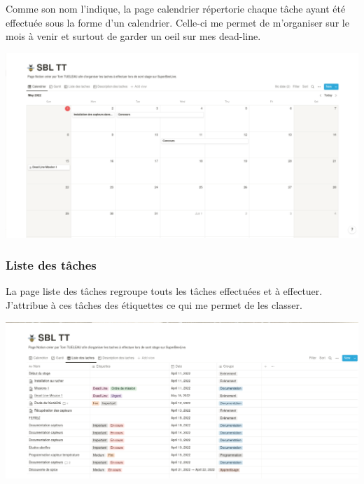 \documentclass[11pt,french,a4paper]{article}
\begin{document}
Comme son nom l'indique, la page calendrier répertorie chaque tâche ayant été effectuée sous la forme d'un calendrier. Celle-ci me permet de m'organiser sur le mois à venir et surtout de garder un oeil sur mes dead-line. 
\begin{center}	
\includegraphics[scale=0.35]{../img/notioncalender.png}
\label{Calendrier}
\end{center}

\subsubsection{Liste des tâches}
La page liste des tâches regroupe touts les tâches effectuées et à effectuer. J'attribue à ces tâches des étiquettes ce qui me permet de les classer.   
\begin{center}	
\includegraphics[scale=0.35]{../img/notionlistesdestaches.png}
\label{Liste des taches}
\end{center}
\end{document}
